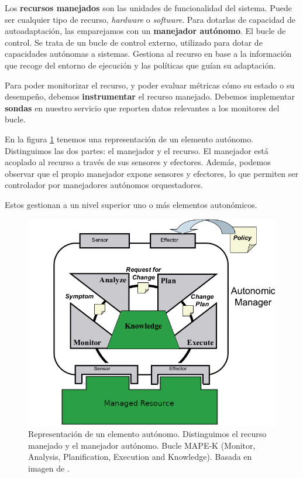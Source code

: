 Los \textbf{recursos manejados} son las unidades de funcionalidad del sistema. Puede ser cualquier tipo de recurso, \emph{hardware} o \emph{software}. Para dotarlas de capacidad de autoadaptación, las emparejamos con un \textbf{manejador autónomo}. El bucle de control. Se trata de un bucle de control externo, utilizado para dotar de capacidades autónomas a sistemas. Gestiona al recurso en base a la información que recoge del entorno de ejecución y las políticas que guían su adaptación.

Para poder monitorizar el recurso, y poder evaluar métricas cómo su estado o su desempeño, debemos \textbf{instrumentar} el recurso manejado. Debemos implementar \textbf{sondas} en nuestro servicio que reporten datos relevantes a los monitores del bucle.

En la figura \ref{fig:autonomic-element} tenemos una representación de un elemento autónomo. Distinguimos las dos partes: el manejador y el recurso. El manejador está acoplado al recurso a través de sus sensores y efectores. Además, podemos observar que el propio manejador expone sensores y efectores, lo que permiten ser controlador por manejadores autónomos orquestadores.

Estos gestionan a un nivel superior uno o más elementos autonómicos.

\begin{figure}[h]
  \centering
  \includegraphics[scale=2]{02_contexto_tecnologico/images/autonomic-element}
  \caption[Representación de un elemento autónomo. Distinguimos el recurso manejado y el manejador autónomo. Bucle MAPE-K (Monitor, Analysis, Planification, Execution and Knowledge)]{Representación de un elemento autónomo. Distinguimos el recurso manejado y el manejador autónomo. Bucle MAPE-K (Monitor, Analysis, Planification, Execution and Knowledge). Basada en imagen de \cite{ibmcorporationArchitecturalBlueprintAutonomic2006}.}
  \label{fig:autonomic-element}
\end{figure}

